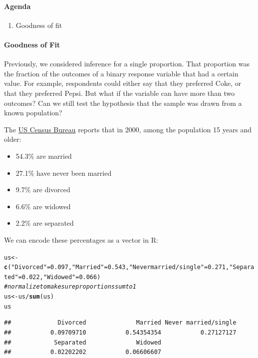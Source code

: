 \documentclass[10pt]{article}\usepackage[]{graphicx}\usepackage[]{color}
\makeatletter
\newcommand{\hlnum}[1]{\textcolor[rgb]{0.686,0.059,0.569}{#1}}%
\newcommand{\hlstr}[1]{\textcolor[rgb]{0.192,0.494,0.8}{#1}}%
\newcommand{\hlcom}[1]{\textcolor[rgb]{0.678,0.584,0.686}{\textit{#1}}}%
\newcommand{\hlopt}[1]{\textcolor[rgb]{0,0,0}{#1}}%
\newcommand{\hlstd}[1]{\textcolor[rgb]{0.345,0.345,0.345}{#1}}%
\newcommand{\hlkwb}[1]{\textcolor[rgb]{0.69,0.353,0.396}{#1}}%
\newcommand{\hlkwd}[1]{\textcolor[rgb]{0.737,0.353,0.396}{\textbf{#1}}}%
\newenvironment{kframe}{%
 \def\at@end@of@kframe{}%
 \ifinner\ifhmode%
  \def\at@end@of@kframe{\end{minipage}}%
  \begin{minipage}{\columnwidth}%
 \fi\fi%
 \def\FrameCommand##1{\hskip\@totalleftmargin \hskip-\fboxsep
 \colorbox{shadecolor}{##1}\hskip-\fboxsep
     \hskip-\linewidth \hskip-\@totalleftmargin \hskip\columnwidth}%
 \MakeFramed {\advance\hsize-\width
   \@totalleftmargin\z@ \linewidth\hsize
   \@setminipage}}%
 {\par\unskip\endMakeFramed%
 \at@end@of@kframe}
\newenvironment{knitrout}{}{} %
\newcommand{\R}{{\sf R}\xspace}
\makeatother
\begin{document}
\paragraph{Agenda}
\begin{enumerate}
  \itemsep0em
  \item Goodness of fit
\end{enumerate}

\paragraph{Goodness of Fit}

Previously, we considered inference for a single proportion. That proportion was the fraction of the outcomes of a binary response variable that had a certain value. For example, respondents could either say that they preferred Coke, or that they preferred Pepsi. But what if the variable can have more than two outcomes? Can we still test the hypothesis that the sample was drawn from a known population? 

The \href{https://www.census.gov/prod/2003pubs/c2kbr-30.pdf}{US Census Bureau} reports that in 2000, among the population 15 years and older:
\begin{itemize}
  \itemsep0in
  \item 54.3\% are married
  \item 27.1\% have never been married
  \item 9.7\% are divorced
  \item 6.6\% are widowed
  \item 2.2\% are separated
\end{itemize}

We can encode these percentages as a vector in \R:

\begin{knitrout}\footnotesize
{}\color{fgcolor}\begin{kframe}
\begin{alltt}
\hlstd{us} \hlkwb{<-} \hlkwd{c}\hlstd{(}\hlstr{"Divorced"} \hlstd{=} \hlnum{0.097}\hlstd{,} \hlstr{"Married"} \hlstd{=} \hlnum{0.543}\hlstd{,} \hlstr{"Never married/single"} \hlstd{=} \hlnum{0.271}\hlstd{,}  \hlstr{"Separated"} \hlstd{=} \hlnum{0.022}\hlstd{,} \hlstr{"Widowed"} \hlstd{=} \hlnum{0.066}\hlstd{)}
\hlcom{# normalize to make sure proportions sum to 1}
\hlstd{us} \hlkwb{<-} \hlstd{us} \hlopt{/} \hlkwd{sum}\hlstd{(us)}
\hlstd{us}
\end{alltt}
\begin{verbatim}
##             Divorced              Married Never married/single 
##           0.09709710           0.54354354           0.27127127 
##            Separated              Widowed 
##           0.02202202           0.06606607
\end{verbatim}
\end{kframe}
\end{knitrout}
\end{document}
